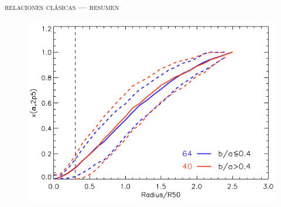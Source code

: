 \documentclass[xcolor=dvipsnames,fleqn,hyperref={colorlinks,citecolor=black,linkcolor=black,urlcolor=black}]{beamer}
\begin{document}
\begin{frame}{\textsc{relaciones clásicas --- resumen}}%


\begin{figure}
\includegraphics[scale=1]{img/iglesias-paramo2013-1}
\end{figure}

\end{frame}
\end{document}
